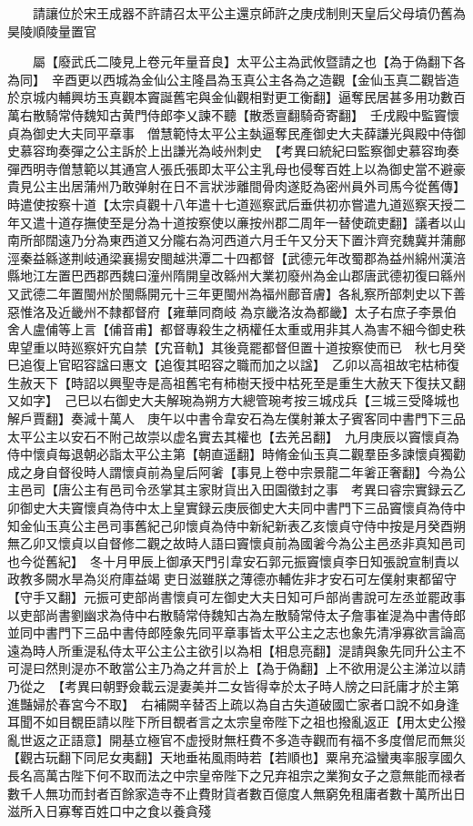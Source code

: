 　　請讓位於宋王成器不許請召太平公主還京師許之庚戌制則天皇后父母墳仍舊為昊陵順陵量置官

　　屬【廢武氏二陵見上卷元年量音良】太平公主為武攸暨請之也【為于偽翻下各為同】　辛酉更以西城為金仙公主隆昌為玉真公主各為之造觀【金仙玉真二觀皆造於京城内輔興坊玉真觀本竇誕舊宅與金仙觀相對更工衡翻】逼奪民居甚多用功數百萬右散騎常侍魏知古黄門侍郎李乂諫不聽【散悉亶翻騎奇寄翻】　壬戌殿中監竇懷貞為御史大夫同平章事　僧慧範恃太平公主埶逼奪民產御史大夫薛謙光與殿中侍御史慕容珣奏彈之公主訴於上出謙光為岐州刺史　【考異曰統紀曰監察御史慕容珣奏彈西明寺僧慧範以其通宫人張氏張即太平公主乳母也侵奪百姓上以為御史當不避豪貴見公主出居蒲州乃敢弹射在日不言狀涉離間骨肉遂貶為密州員外司馬今從舊傳】　時遣使按察十道【太宗貞觀十八年遣十七道廵察武后垂供初亦嘗遣九道廵察天授二年又遣十道存撫使至是分為十道按察使以亷按州郡二周年一替使疏吏翻】議者以山南所部闊遠乃分為東西道又分隴右為河西道六月壬午又分天下置汴齊兖魏冀并蒲鄜涇秦益緜遂荆岐通梁襄揚安閩越洪潭二十四都督【武德元年改蜀郡為益州綿州漢涪縣地江左置巴西郡西魏曰潼州隋開皇改緜州大業初廢州為金山郡唐武德初復曰緜州又武德二年置閩州於閩縣開元十三年更閩州為福州鄜音膚】各糺察所部刺史以下善惡惟洛及近畿州不隸都督府【雍華同商岐為京畿洛汝為都畿】太子右庶子李景伯舍人盧俌等上言【俌音甫】都督專殺生之柄權任太重或用非其人為害不細今御史秩卑望重以時廵察奸宄自禁【宄音軌】其後竟罷都督但置十道按察使而已　秋七月癸巳追復上官昭容諡曰惠文【追復其昭容之職而加之以諡】　乙卯以高祖故宅枯柿復生赦天下【時詔以興聖寺是高祖舊宅有柿樹天授中枯死至是重生大赦天下復扶又翻又如字】　己巳以右御史大夫解琬為朔方大總管琬考按三城戍兵【三城三受降城也解戶賈翻】奏減十萬人　庚午以中書令韋安石為左僕射兼太子賓客同中書門下三品太平公主以安石不附己故崇以虚名實去其權也【去羌呂翻】　九月庚辰以竇懷貞為侍中懷貞每退朝必詣太平公主第【朝直遥翻】時脩金仙玉真二觀羣臣多諫懷貞獨勸成之身自督役時人謂懷貞前為皇后阿㸙【事見上卷中宗景龍二年㸙正奢翻】今為公主邑司【唐公主有邑司令丞掌其主家財貨出入田園徵封之事　考異曰睿宗實録云乙卯御史大夫竇懷貞為侍中太上皇實録云庚辰御史大夫同中書門下三品竇懷貞為侍中知金仙玉真公主邑司事舊紀己卯懷貞為侍中新紀新表乙亥懷貞守侍中按是月癸酉朔無乙卯又懷貞以自督修二觀之故時人語曰竇懷貞前為國㸙今為公主邑丞非真知邑司也今從舊紀】　冬十月甲辰上御承天門引韋安石郭元振竇懷貞李日知張說宣制責以政教多闕水旱為災府庫益竭吏日滋雖朕之薄德亦輔佐非才安石可左僕射東都留守【守手又翻】元振可吏部尚書懷貞可左御史大夫日知可戶部尚書說可左丞並罷政事以吏部尚書劉幽求為侍中右散騎常侍魏知古為左散騎常侍太子詹事崔湜為中書侍郎並同中書門下三品中書侍郎陸象先同平章事皆太平公主之志也象先清凈寡欲言論高遠為時人所重湜私侍太平公主公主欲引以為相【相息亮翻】湜請與象先同升公主不可湜曰然則湜亦不敢當公主乃為之幷言於上【為于偽翻】上不欲用湜公主涕泣以請乃從之　【考異曰朝野僉載云湜妻美并二女皆得幸於太子時人牓之曰託庸才於主第進豔婦於春宮今不取】　右補闕辛替否上疏以為自古失道破國亡家者口說不如身逢耳聞不如目覩臣請以陛下所目覩者言之太宗皇帝陛下之祖也撥亂返正【用太史公撥亂世返之正語意】開基立極官不虚授財無枉費不多造寺觀而有福不多度僧尼而無災【觀古玩翻下同尼女夷翻】天地垂祐風雨時若【若順也】粟帛充溢蠻夷率服享國久長名高萬古陛下何不取而法之中宗皇帝陛下之兄弃祖宗之業狥女子之意無能而禄者數千人無功而封者百餘家造寺不止費財貨者數百億度人無窮免租庸者數十萬所出日滋所入日寡奪百姓口中之食以養貪殘
